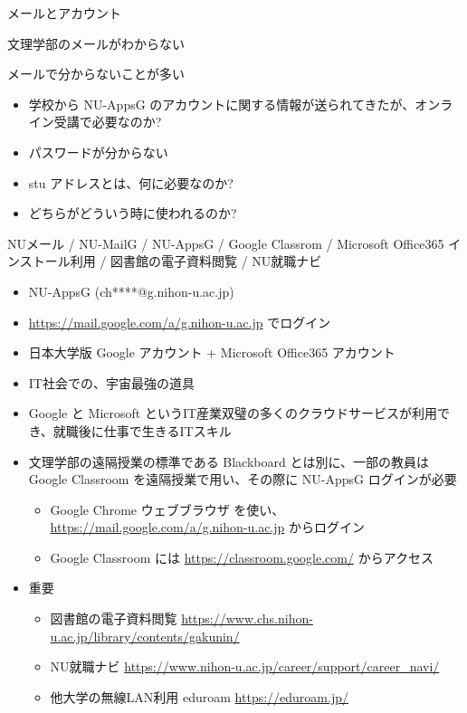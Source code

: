 \documentclass[a4j,10pt]{jsarticle}
\begin{document}
{\begin{frame}[label={sec:org4aad05a},fragile]{メールとアカウント}
\begin{block}{文理学部のメールがわからない}
\begin{itemize}
\begin{itemize}
\end{itemize}
\end{itemize}
\end{block}
\par
\begin{block}{メールで分からないことが多い}
\begin{itemize}
\item 学校から NU-AppsG のアカウントに関する情報が送られてきたが、オンライン受講で必要なのか?
\item パスワードが分からない
\par
\item stu アドレスとは、何に必要なのか?
\item どちらがどういう時に使われるのか?
\end{itemize}
\end{block}
\par
\begin{block}{NUメール / NU-MailG / NU-AppsG / Google Classrom / Microsoft Office365 インストール利用 / 図書館の電子資料閲覧 / NU就職ナビ}
\begin{itemize}
\item NU-AppsG (ch****@g.nihon-u.ac.jp)
\item \url{https://mail.google.com/a/g.nihon-u.ac.jp} でログイン
\item 日本大学版 Google アカウント + Microsoft Office365 アカウント
\item IT社会での、宇宙最強の道具
\item Google と Microsoft というIT産業双璧の多くのクラウドサービスが利用でき、就職後に仕事で生きるITスキル
\item 文理学部の遠隔授業の標準である Blackboard とは別に、一部の教員は Google Classroom を遠隔授業で用い、その際に NU-AppsG ログインが必要
\begin{itemize}
\item Google Chrome ウェブブラウザ を使い、 \url{https://mail.google.com/a/g.nihon-u.ac.jp} からログイン
\item Google Classroom には \url{https://classroom.google.com/} からアクセス
\end{itemize}
\item 重要
\begin{itemize}
\item 図書館の電子資料閲覧 \url{https://www.chs.nihon-u.ac.jp/library/contents/gakunin/}
\item NU就職ナビ \url{https://www.nihon-u.ac.jp/career/support/career\_navi/}
\item 他大学の無線LAN利用 eduroam \url{https://eduroam.jp/}

\end{itemize}
\end{itemize}
\end{block}
\end{frame}}
\end{document}
